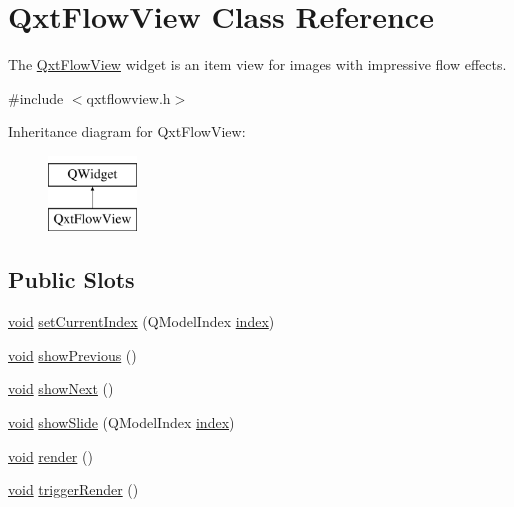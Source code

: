 \hypertarget{class_qxt_flow_view}{\section{Qxt\-Flow\-View Class Reference}
\label{class_qxt_flow_view}
}


The \hyperlink{class_qxt_flow_view}{Qxt\-Flow\-View} widget is an item view for images with impressive flow effects.  




{\ttfamily \#include $<$qxtflowview.\-h$>$}

Inheritance diagram for Qxt\-Flow\-View\-:\begin{figure}[H]
\begin{center}
\leavevmode
\includegraphics[height=2.000000cm]{class_qxt_flow_view}
\end{center}
\end{figure}
\subsection*{Public Slots}
\begin{DoxyCompactItemize}
\item 
\hyperlink{group___u_a_v_objects_plugin_ga444cf2ff3f0ecbe028adce838d373f5c}{void} \hyperlink{class_qxt_flow_view_a86a52757eda584014c263079f9a5fc3c}{set\-Current\-Index} (Q\-Model\-Index \hyperlink{glext_8h_ab47dd9958bcadea08866b42bf358e95e}{index})
\item 
\hyperlink{group___u_a_v_objects_plugin_ga444cf2ff3f0ecbe028adce838d373f5c}{void} \hyperlink{class_qxt_flow_view_adac54dbf435157ed5fa43c68790c331e}{show\-Previous} ()
\item 
\hyperlink{group___u_a_v_objects_plugin_ga444cf2ff3f0ecbe028adce838d373f5c}{void} \hyperlink{class_qxt_flow_view_a8871638c6114a921fc218aad143ac7c7}{show\-Next} ()
\item 
\hyperlink{group___u_a_v_objects_plugin_ga444cf2ff3f0ecbe028adce838d373f5c}{void} \hyperlink{class_qxt_flow_view_a163bb085e48837aabb5801dc027ef968}{show\-Slide} (Q\-Model\-Index \hyperlink{glext_8h_ab47dd9958bcadea08866b42bf358e95e}{index})
\item 
\hyperlink{group___u_a_v_objects_plugin_ga444cf2ff3f0ecbe028adce838d373f5c}{void} \hyperlink{class_qxt_flow_view_aad13bf3b19541393ea193ba156263546}{render} ()
\item 
\hyperlink{group___u_a_v_objects_plugin_ga444cf2ff3f0ecbe028adce838d373f5c}{void} \hyperlink{class_qxt_flow_view_ae10a67c846bda48de274a93e6d6aedfe}{trigger\-Render} ()
\end{DoxyCompactItemize}
